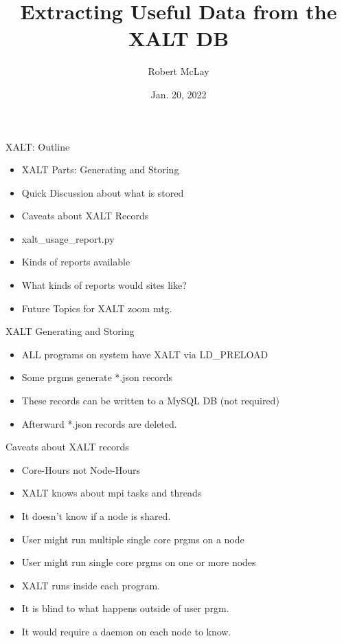 \documentclass{beamer}
\begin{document}
\title[XALT]{Extracting Useful Data from the XALT DB}
\author{Robert McLay} 
\date{Jan. 20, 2022} 

\frame{\titlepage} 

\begin{frame}{XALT: Outline}
  \begin{itemize}
    \item XALT Parts: Generating and Storing
    \item Quick Discussion about what is stored
    \item Caveats about XALT Records
    \item xalt\_usage\_report.py
    \item Kinds of reports available
    \item What kinds of reports would sites like?
    \item Future Topics for XALT zoom mtg.
  \end{itemize}
\end{frame}

\begin{frame}{XALT Generating and Storing}
  \begin{itemize}
    \item ALL programs on system have XALT via LD\_PRELOAD
    \item Some prgms generate *.json records
    \item These records can be written to a MySQL DB (not required) 
    \item Afterward *.json records are deleted.
  \end{itemize}
\end{frame}

\begin{frame}{Caveats about XALT records}
  \begin{itemize}
    \item Core-Hours not Node-Hours 
    \item XALT knows about mpi tasks and threads
    \item It doesn't know if a node is shared.
    \item User might run multiple single core prgms on a node
    \item User might run single core prgms on one or more nodes
    \item XALT runs inside each program.
    \item It is blind to what happens outside of user prgm.
    \item It would require a daemon on each node to know.
  \end{itemize}
\end{frame}
\end{document}
